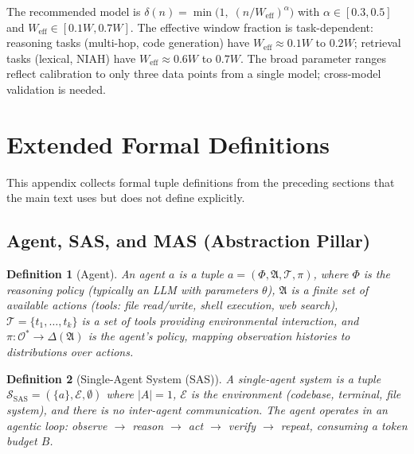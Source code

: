 \documentclass[11pt, a4paper, logo, copyright]{googledeepmind}
\newtheorem{definition}{Definition}[section]
\begin{document}
\begin{appendices}
The recommended model is
$\delta(n) = \min\!\bigl(1,\; (n / W_{\text{eff}})^{\alpha}\bigr)$
with $\alpha \in [0.3, 0.5]$ and $W_{\text{eff}} \in [0.1W, 0.7W]$.
The effective window fraction is task-dependent: reasoning tasks
(multi-hop, code generation) have $W_{\text{eff}} \approx 0.1W$ to $0.2W$;
retrieval tasks (lexical, NIAH) have $W_{\text{eff}} \approx 0.6W$ to $0.7W$.
The broad parameter ranges reflect calibration to only three data points
from a single model; cross-model validation is needed.



\section{Extended Formal Definitions}
\label{app:formal-defs}

This appendix collects formal tuple definitions from the preceding sections
that the main text uses but does not define explicitly.

\subsection{Agent, SAS, and MAS (Abstraction Pillar)}

\begin{definition}[Agent]
\label{def:ext-agent}
An \emph{agent} $a$ is a tuple $a = (\Phi, \mathfrak{A}, \mathcal{T}, \pi)$, where
$\Phi$ is the reasoning policy (typically an LLM with parameters $\theta$),
$\mathfrak{A}$ is a finite set of available actions (tools: file read/write, shell execution, web search),
$\mathcal{T} = \{t_1, \ldots, t_k\}$ is a set of tools providing environmental interaction, and
$\pi: \mathcal{O}^* \to \Delta(\mathfrak{A})$ is the agent's policy,
mapping observation histories to distributions over actions.
\end{definition}

\begin{definition}[Single-Agent System (SAS)]
\label{def:ext-sas}
A \emph{single-agent system} is a tuple
$\mathcal{S}_{\text{SAS}} = (\{a\}, \mathcal{E}, \emptyset)$
where $|A| = 1$, $\mathcal{E}$ is the environment (codebase, terminal, file system),
and there is no inter-agent communication. The agent operates in an agentic loop:
\emph{observe $\to$ reason $\to$ act $\to$ verify $\to$ repeat},
consuming a token budget $B$.
\end{definition}


\end{appendices}
\end{document}
